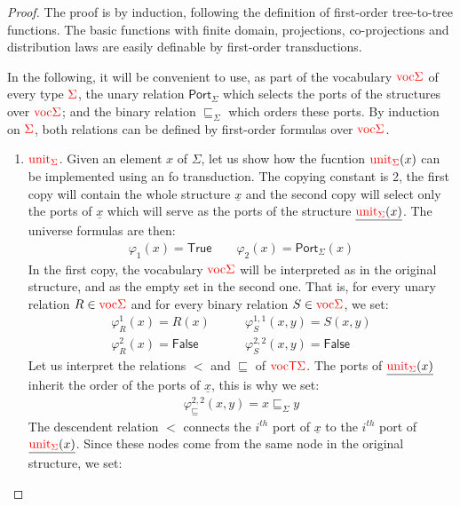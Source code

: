    \begin{proof}
    The proof is by induction, following the definition of first-order tree-to-tree functions. The basic functions with finite domain, projections, co-projections and distribution laws are easily definable by first-order transductions.  
    
    In the following, it will be convenient to use, as part of the vocabulary ${\color{red}{\mathrm{voc}}}{\color{red}{\Sigma}}$ of every type ${\color{red}{\Sigma}}$, the unary relation  $\mathsf{Port}_\Sigma$ which selects the ports of the structures over ${\color{red}{\mathrm{voc}}}{\color{red}{\Sigma}}$; and the binary relation $\sqsubseteq_\Sigma$ which orders these ports. By induction on ${\color{red}{\Sigma}}$, both relations can be defined by first-order formulas over  ${\color{red}{\mathrm{voc}}}{\color{red}{\Sigma}}$.
    
    \begin{enumerate}
    \item ${\color{red}{\mathrm{unit}}}_{\color{red}{\Sigma}}$. Given an element $x$ of $\Sigma$, let us show how the fucntion ${\color{red}{\mathrm{unit}}}_{\color{red}{\Sigma}}(x)$ can be implemented using an fo transduction.  The copying constant is 2,
    the first copy will contain the whole structure $\underline{x}$ and the second copy will select only the ports of $\underline{x}$ which will serve as the ports of the structure $\underline{{\color{red}{\mathrm{unit}}}_{\color{red}{\Sigma}}(x)}$.  The universe formulas are then:
    \begin{align*}
    \varphi_1(x)=\mathsf{True} \qquad \varphi_2(x)=\mathsf{Port}_\Sigma(x)
    \end{align*}
    In the first copy, the vocabulary ${\color{red}{\mathrm{voc}}}{\color{red}{\Sigma}}$ will be interpreted as in the original structure, and as the empty set in the second one. That is, for every unary relation $R\in {\color{red}{\mathrm{voc}}}{\color{red}{\Sigma}}$ and for every binary relation $S \in {\color{red}{\mathrm{voc}}}{\color{red}{\Sigma}}$, we set:
    \begin{align*}
   \varphi_R^{1}(x)=R(x) \quad&\quad \varphi_S^{1,1}(x,y)=S(x,y)\\
   \varphi_R^{2}(x)=\mathsf{False} \quad&\quad \varphi_S^{2,2}(x,y)=\mathsf{False}
\end{align*}      
Let us interpret the relations $<$ and $\sqsubseteq$ of ${\color{red}{\mathrm{voc}}}{\color{red}{\mathsf T}}{\color{red}{\Sigma}}$. The  ports of $\underline{{\color{red}{\mathrm{unit}}}_{\color{red}{\Sigma}}(x)}$ inherit the order of the ports of $\underline{x}$, this is why we set:
\begin{align*}
\varphi_\sqsubseteq^{2,2}(x,y)=x\sqsubseteq_\Sigma y
\end{align*}
The descendent relation $<$ connects the $i^{th}$ port of $\underline{x}$ to the $i^{th}$ port of $\underline{{\color{red}{\mathrm{unit}}}_{\color{red}{\Sigma}}(x)}$. Since these nodes come from the same node in the original structure, we set:

\end{enumerate}
\end{proof}
